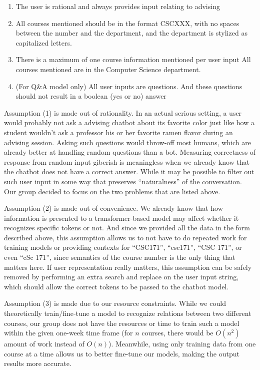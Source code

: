 \begin{enumerate}
\item The user is rational and always provides input relating to advising
\item All courses mentioned should be in the format CSCXXX, with no spaces
between the number and the department, and the department is stylized as
capitalized letters.
\item There is a maximum of one course information mentioned per user input
All courses mentioned are in the Computer Science department.
\item (For Q\&A model only) All user inputs are questions. And these questions
should not result in a boolean (yes or no) answer
\end{enumerate}

Assumption (1) is made out of rationality. In an actual serious setting, a user
would probably not ask a advising chatbot about its favorite color just like how
a student wouldn't ask a professor his or her favorite ramen flavor during an
advising session. Asking such questions would throw-off most humans, which are
already better at handling random questions than a bot. Measuring correctness
of response from random input giberish is meaningless when we already know that
the chatbot does not have a correct answer. While it may be possible to filter
out such user input in some way that preserves ``naturalness'' of the
conversation. Our group decided to focus on the two problems that are listed
above.

Assumption (2) is made out of convenience. We already know that how information
is presented to a transformer-based model may affect whether it recognizes
specific tokens or not. And since we provided all the data in the form described
above, this assumption allows us to not have to do repeated work for training
models or providing contexts for ``CSC171'', ``csc171'', ``CSC 171'', or even
``cSc 171'', since semantics of the course number is the only thing that matters
here. If user representation really matters, this assumption can be safely
removed by performing an extra search and replace on the user input string,
which should allow the correct tokens to be passed to the chatbot model.

Assumption (3) is made due to our resource constraints. While we could
theoretically train/fine-tune a model to recognize relations between two
different courses, our group does not have the resources or time to train such a
model within the given one-week time frame (for $n$ courses, there would be
$O(n^2)$ amount of work instead of $O(n)$). Meanwhile, using only training data
from one course at a time allows us to better fine-tune our models, making the
output results more accurate.


